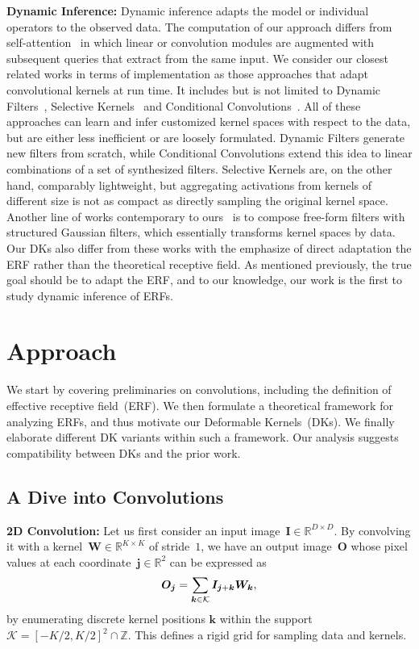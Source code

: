 \documentclass{article} \usepackage{iclr2020_conference, times}
\def\vj{{\bm{j}}}
\def\vk{{\bm{k}}}
\def\mI{{\bm{I}}}
\def\mO{{\bm{O}}}
\def\mW{{\bm{W}}}
\def\gK{{\mathcal{K}}}
\def\sR{{\mathbb{R}}}
\def\sZ{{\mathbb{Z}}}
\newcommand{\bfsection}[1]{\noindent\textbf{#1:}}
\begin{document}
\bfsection{Dynamic Inference}
Dynamic inference adapts the model or individual operators to the observed
data.
The computation of our approach differs from
self-attention~\citep{vaswani2017attention,wang2018non} in which linear or
convolution modules are augmented with subsequent queries that extract from the same
input.
We consider our closest related works in terms of implementation as
those approaches that adapt convolutional kernels at run time.
It includes but is not limited to Dynamic Filters~\citep{jia2016dynamic},
Selective Kernels~\citep{li2019selective} and Conditional
Convolutions~\citep{yang2019soft}.
All of these approaches can learn and infer customized kernel spaces with respect to the
data, but are either less inefficient or are loosely formulated.
Dynamic Filters generate new filters from scratch, while Conditional
Convolutions extend this idea to linear combinations of a set of synthesized
filters.
Selective Kernels are, on the other hand, comparably lightweight, but
aggregating activations from kernels of different size is not as compact as
directly sampling the original kernel space.
Another line of works contemporary
to ours~\citep{shelhamer2019blurring,wang2019dynamic} is to compose free-form
filters with structured Gaussian filters, which essentially transforms kernel
spaces by data.
Our DKs also differ from these works with the emphasize of direct adaptation
the ERF rather than the theoretical receptive field.
As mentioned previously, the true goal should be to adapt the ERF, and to our knowledge, our work is the first to study dynamic inference of ERFs.
 \section{Approach}

We start by covering preliminaries on convolutions, including the
definition of effective receptive field~(ERF).
We then formulate a theoretical framework for analyzing ERFs, and thus motivate
our Deformable Kernels~(DKs).
We finally elaborate different DK variants within such a framework.
Our analysis suggests compatibility between DKs and the prior work.

\subsection{A Dive into Convolutions} \label{sec:diving}

\bfsection{2D Convolution}
Let us first consider an input image~$\mI \in \sR^{D \times D}$.
By convolving it with a kernel~$\mW \in \sR^{K \times K}$ of stride~$1$, we
have an output image~$\mO$ whose pixel values at each coordinate~$\vj \in
\sR^2$ can be expressed as
\begin{equation}
\small
    \label{eq:conv2d}
    \mO_{\vj} =
    \sum_{\vk \in \gK} \mI_{\vj + \vk} \mW_{\vk},
\end{equation}
by enumerating discrete kernel positions $\vk$ within the support~$\gK = [-K /
2, K / 2]^2 \cap \sZ$. This defines a rigid grid for sampling data and kernels.
\end{document}
